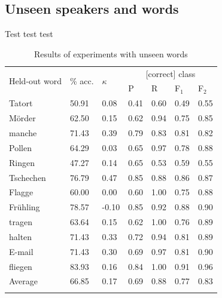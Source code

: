 	\subsection{Unseen speakers and words}
	\label{sec:classification:unseen}
	
		Test test test 
		
		
		

		
		
	\begin{table}
			\centering
			\caption{Results of experiments with unseen words  }
			\begin{tabularx}{\textwidth}{lXXXXXX}			
			\toprule
			\multirow{2}{*}{Held-out word} & \multirow{2}{*}{\% acc.} & \multirow{2}{*}{$\kappa$} & \multicolumn{4}{c}{[correct] class} \\
			\cmidrule(lr){4-7}
			& & & P & R & F$_1$ & F$_2$ \\
			\midrule
Tatort	&	50.91	&	0.08	&	0.41	&	0.60	&	0.49	&	0.55	\\
M\"order	&	62.50	&	0.15	&	0.62	&	0.94	&	0.75	&	0.85	\\
manche	&	71.43	&	0.39	&	0.79	&	0.83	&	0.81	&	0.82	\\
Pollen	&	64.29	&	0.03	&	0.65	&	0.97	&	0.78	&	0.88	\\
Ringen	&	47.27	&	0.14	&	0.65	&	0.53	&	0.59	&	0.55	\\
Tschechen	&	76.79	&	0.47	&	0.85	&	0.88	&	0.86	&	0.87	\\
Flagge	&	60.00	&	0.00	&	0.60	&	1.00	&	0.75	&	0.88	\\
Fr\"uhling	&	78.57	&	-0.10	&	0.85	&	0.92	&	0.88	&	0.90	\\
tragen	&	63.64	&	0.15	&	0.62	&	1.00	&	0.76	&	0.89	\\
halten	&	71.43	&	0.33	&	0.72	&	0.94	&	0.81	&	0.89	\\
E-mail	&	71.43	&	0.30	&	0.69	&	0.97	&	0.81	&	0.90	\\
fliegen	&	83.93	&	0.16	&	0.84	&	1.00	&	0.91	&	0.96	\\
\addlinespace													
Average	&	66.85	&	0.17	&	0.69	&	0.88	&	0.77	&	0.83	\\
			\bottomrule
			\label{tab:results:words}
			\end{tabularx}
		\end{table}
	
